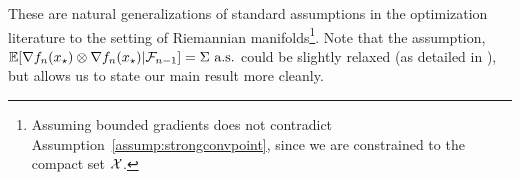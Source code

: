 These are natural generalizations of standard assumptions in the optimization literature \citep{Fab68} to the setting of
Riemannian manifolds\footnote{Assuming bounded gradients does not contradict Assumption~\ref{assump:strongconvpoint}, since we are constrained to the compact set $\mathcal{X}$.}. Note that the assumption, \\ $\mathbb{E}[\nabla f_n(x_\star) \otimes \nabla f_n(x_\star) \vert\mathcal F_{n-1}] = \Sigma \text{ a.s.}$ could be slightly relaxed (as detailed in ),
but allows us to state our main result more cleanly.
